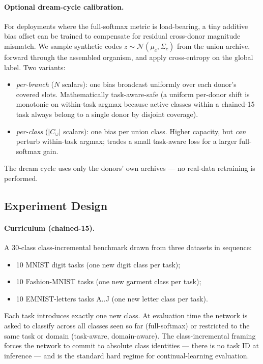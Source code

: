 \documentclass[11pt]{article}
\begin{document}
\paragraph{Optional dream-cycle calibration.} For deployments where the
full-softmax metric is load-bearing, a tiny additive bias offset can be
trained to compensate for residual cross-donor magnitude mismatch. We
sample synthetic codes $z \sim \mathcal{N}(\mu_c, \Sigma_c)$ from the
union archive, forward through the assembled organism, and apply
cross-entropy on the global label. Two variants:
\begin{itemize}[leftmargin=1.5em]
  \item \emph{per-branch} ($N$ scalars): one bias broadcast uniformly
        over each donor's covered slots. Mathematically task-aware-safe
        (a uniform per-donor shift is monotonic on within-task argmax
        because active classes within a chained-15 task always belong
        to a single donor by disjoint coverage).
  \item \emph{per-class} ($|C_{\cup}|$ scalars): one bias per union
        class. Higher capacity, but \emph{can} perturb within-task
        argmax; trades a small task-aware loss for a larger full-softmax
        gain.
\end{itemize}
The dream cycle uses only the donors' own archives --- no real-data
retraining is performed.

\subsection{Experiment Design}
\label{sec:experiment-design}

\paragraph{Curriculum (chained-15).}
A 30-class class-incremental benchmark drawn from three datasets in
sequence:
\begin{itemize}[leftmargin=1.5em]
  \item 10 MNIST digit tasks (one new digit class per task);
  \item 10 Fashion-MNIST tasks (one new garment class per task);
  \item 10 EMNIST-letters tasks A..J (one new letter class per task).
\end{itemize}
Each task introduces exactly one new class. At evaluation time the network
is asked to classify across all classes seen so far (full-softmax) or
restricted to the same task or domain (task-aware, domain-aware). The
class-incremental framing forces the network to commit to absolute class
identities --- there is no task ID at inference --- and is the standard
hard regime for continual-learning evaluation.
\end{document}
